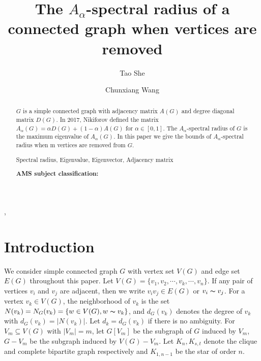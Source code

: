 \documentclass[amsthm]{elsart}
\begin{document}
\begin{frontmatter}
\title{The $A_{\alpha}$-spectral radius of a connected graph when vertices  are removed }

\journal{~~}

\author[CW]{Tao She},
\author[CW]{Chunxiang Wang}



\address[CW]{ School of Mathematics and Statistics, Central China Normal University, Wuhan,  P.R. China}







\begin{abstract}
$G$ is a simple connected graph with adjacency matrix $A(G)$ and degree diagonal matrix $D(G)$.
 In 2017, Nikiforov  \cite{2016Merging} defined the matrix $A_{\alpha}(G) = \alpha D(G) + (1- \alpha)A(G)$ for $\alpha \in [0, 1].$
The $A_\alpha$-spectral radius of $G$ is the maximum eigenvalue of $A_\alpha(G)$.
In this paper we give the bounds of $A_\alpha$-spectral radius when m vertices are removed from $G$.

\vskip 2mm   Spectral radius,  Eigenvalue,  Eigenvector,  Adjacency matrix

{\bf AMS subject classification:}


\end{abstract}


\end{frontmatter}

\section{Introduction}

\qquad  We consider simple connected graph $G$ with vertex set $V(G)$ and edge set $E(G)$  throughout this paper.   Let $V(G)=\{v_1, v_2, \cdots, v_k, \cdots, v_n\}$. If any pair of vertices $v_i$ and $v_j$ are adjacent, then we write $v_iv_j \in E(G)$ or $v_i \thicksim v_j$. For a vertex $v_k \in V(G)$, the neighborhood of  $v_k $ is the set $N(v_k) = N_G(v_k) = \{w \in V(G), w  \thicksim  v_k   \}$, and $d_G(v_k)$  denotes the degree of $v_k$ with $ d_{G}(v_k) = |N(v_k)|$.  Let $d_k=d_G(v_k)$  if there
is no ambiguity. For $V_m \subseteq V(G)$ with $|V_m|=m$,   let $G[V_m]$ be the subgraph of $G$ induced by $V_m$, $G - V_m$ be the subgraph induced by $V(G) - V_m$. Let $K_n, K_{s,t}$   denote the clique and complete bipartite graph respectively and  $K_{1,n-1}$ be the star of order $n$.
\end{document}
